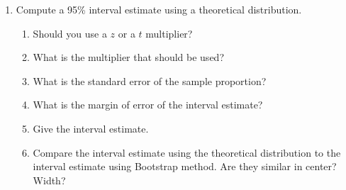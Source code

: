 \begin{enumerate}
\begin{enumerate}
       \item Compute a 95\% interval estimate using a theoretical
         distribution.
         \begin{enumerate}
           \item Should you use a $z$ or a $t$ multiplier? 
\begin{students}
          \vspace{.5cm}
\end{students}
\begin{key}
 {\it  }      
\end{key}
           \item What is the multiplier that should be used? 
\begin{students}
          \vspace{.5cm}
\end{students}
\begin{key}
 {\it  }      
\end{key}
           \item What is the standard error of the sample proportion?
\begin{students}
          \vspace{1cm}
\end{students}
\begin{key}
 {\it  }      
\end{key}
           \item What is the margin of error of the interval estimate? \vspace{.5cm}
           \item Give the interval estimate.
\begin{students}
          \vspace{.5cm}
\end{students}
\begin{key}
 {\it  }      
\end{key}
          
           \item Compare the interval estimate using the theoretical
             distribution to the interval estimate using Bootstrap
             method.  Are they similar in center?  Width? 
\begin{students}
          \vspace*{2cm} \newpage
\end{students}
\begin{key}
 {\it  }      
\end{key}
           \end{enumerate}


\end{enumerate}
\end{enumerate}

